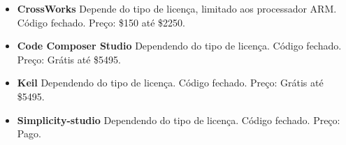 \begin{itemize}
 \item \textbf{CrossWorks}
 \subitem Depende do tipo de licença, limitado aos processador ARM.
 \subitem Código fechado.
 \subitem Preço: \$150 até \$2250.

 \item \textbf{Code Composer Studio}
 \subitem Dependendo do tipo de licença.
 \subitem Código fechado.
 \subitem Preço: Grátis até \$5495.
 
 \item \textbf{Keil}
 \subitem Dependendo do tipo de licença.
 \subitem Código fechado.
 \subitem Preço: Grátis até \$5495.
 
 \item \textbf{Simplicity-studio}
 \subitem Dependendo do tipo de licença.
 \subitem Código fechado.
 \subitem Preço: Pago.

\end{itemize}
\fi

